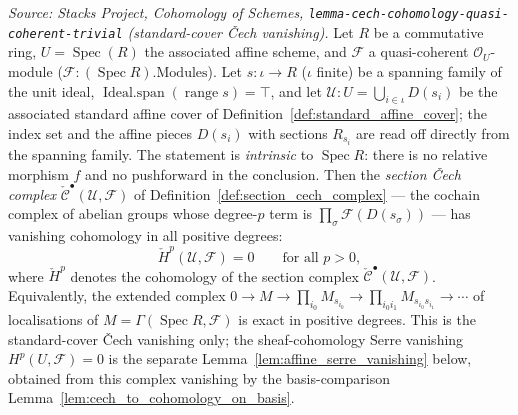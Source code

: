 \begin{lemma}
  \textit{Source: Stacks Project, Cohomology of Schemes,
  \texttt{lemma-cech-cohomology-quasi-coherent-trivial} (standard-cover {\v C}ech
  vanishing).}
  Let \(R\) be a commutative ring, \(U = \operatorname{Spec}(R)\) the associated
  affine scheme, and \(\mathcal{F}\) a quasi-coherent \(\mathcal{O}_U\)-module
  (\(\mathcal{F} : (\operatorname{Spec} R).\mathrm{Modules}\)). Let
  \(s : \iota \to R\) (\(\iota\) finite) be a spanning family of the unit ideal,
  \(\operatorname{Ideal.span}(\operatorname{range} s) = \top\), and let
  \(\mathcal{U} : U = \bigcup_{i \in \iota} D(s_i)\) be the associated standard
  affine cover of Definition~\ref{def:standard_affine_cover}; the index set and the
  affine pieces \(D(s_i)\) with sections \(R_{s_i}\) are read off directly from the
  spanning family. The statement is \emph{intrinsic} to \(\operatorname{Spec} R\):
  there is no relative morphism \(f\) and no pushforward in the conclusion. Then the
  \emph{section {\v C}ech complex} \(\check{\mathcal{C}}^\bullet(\mathcal{U},
  \mathcal{F})\) of Definition~\ref{def:section_cech_complex} --- the cochain
  complex of abelian groups whose degree-\(p\) term is
  \(\prod_{\sigma}\mathcal{F}(D(s_\sigma))\) --- has vanishing cohomology in all
  positive degrees:
  \[
    \check{H}^p(\mathcal{U}, \mathcal{F}) = 0 \qquad \text{for all } p > 0,
  \]
  where \(\check{H}^p\) denotes the cohomology of the section complex
  \(\check{\mathcal{C}}^\bullet(\mathcal{U}, \mathcal{F})\). Equivalently, the
  extended complex
  \(0 \to M \to \prod_{i_0} M_{s_{i_0}} \to \prod_{i_0 i_1} M_{s_{i_0} s_{i_1}}
  \to \cdots\) of localisations of \(M = \Gamma(\operatorname{Spec} R, \mathcal{F})\)
  is exact in positive degrees. This is the standard-cover {\v C}ech vanishing
  only; the sheaf-cohomology Serre vanishing \(H^p(U, \mathcal{F}) = 0\) is the
  separate Lemma~\ref{lem:affine_serre_vanishing} below, obtained from this complex
  vanishing by the basis-comparison Lemma~\ref{lem:cech_to_cohomology_on_basis}.
\end{lemma}

